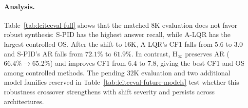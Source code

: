 \begin{table}[!htbp]
\centering
\scriptsize
\caption{Reserved L-CiteEval blocks for two additional model families.  Each
model will use the same $8$K calibration and $8$K/$16$K/$32$K evaluation
protocol as Table~\ref{tab:lciteeval-full}.}
\label{tab:lciteeval-future-models}
\setlength{\tabcolsep}{3.5pt}
\end{table}

\paragraph{Analysis.}
Table~\ref{tab:lciteeval-full} shows that the matched $8$K evaluation does not
favor robust synthesis: S-PID has the
highest answer recall, while A-LQR has the largest controlled OS.  After the
shift to $16$K, A-LQR's CF1 falls from $5.6$ to $3.0$ and S-PID's AR falls
from $72.1\%$ to $61.9\%$.  In contrast, $\mathrm{H}_{\infty}$ preserves AR
($66.4\%\!\rightarrow\!65.2\%$) and improves CF1 from $6.4$ to $7.8$, giving
the best CF1 and OS among controlled methods.  The pending $32$K evaluation
and two additional model families reserved in
Table~\ref{tab:lciteeval-future-models} test whether this robustness crossover
strengthens with shift severity and persists across architectures.

\FloatBarrier
